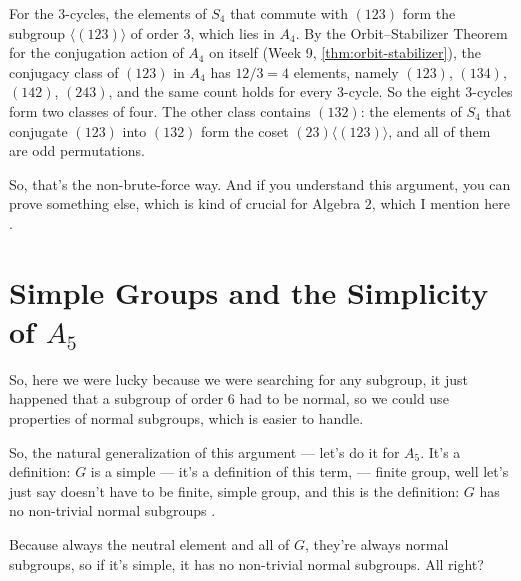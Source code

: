\begin{proofWrapper}
\begin{content}
\begin{steps}
For the $3$-cycles, the elements of $S_4$ that commute with $(123)$ form the subgroup $\langle (123) \rangle$ of order $3$, which lies in $A_4$. By the Orbit--Stabilizer Theorem for the conjugation action of $A_4$ on itself (Week 9, \cref{thm:orbit-stabilizer}), the conjugacy class of $(123)$ in $A_4$ has $12 / 3 = 4$ elements, namely $(123)$, $(134)$, $(142)$, $(243)$, and the same count holds for every $3$-cycle. So the eight $3$-cycles form two classes of four. The other class contains $(132)$: the elements of $S_4$ that conjugate $(123)$ into $(132)$ form the coset $(23)\langle (123) \rangle$, and all of them are odd permutations.
\end{steps}
\end{content}

\end{proofWrapper}

\begin{speech}[00:20:42 - 00:21:38]
So, that's the non-brute-force way. And if you understand this argument, you can prove something else, which is kind of crucial for Algebra $2$, which I mention here .
\end{speech}

\section{Simple Groups and the Simplicity of \texorpdfstring{$A_5$}{A5}}

\begin{speech}[00:21:38 - 00:22:28]
So, here we were lucky because we were searching for any subgroup, it just happened that a subgroup of order $6$ had to be normal, so we could use properties of normal subgroups, which is easier to handle.

So, the natural generalization of this argument --- let's do it for $A_5$. It's a definition: $G$ is a simple --- it's a definition of this term,  --- finite group, well let's just say doesn't have to be finite, simple group, and this is the definition: $G$ has no non-trivial normal subgroups .

Because always the neutral element and all of $G$, they're always normal subgroups, so if it's simple, it has no non-trivial normal subgroups. All right?
\end{speech}

